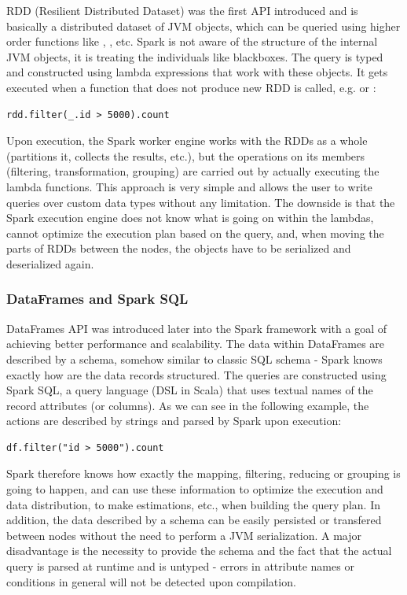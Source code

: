 RDD (Resilient Distributed Dataset) was the first API introduced and is basically a distributed dataset of JVM objects, which can be queried using higher order functions like , , etc. Spark is not aware of the structure of the internal JVM objects, it is treating the individuals like blackboxes. The query is typed and constructed using lambda expressions that work with these objects. It gets executed when a function that does not produce new RDD is called, e.g.  or :

\lstset{style=Scala}
\begin{lstlisting}
rdd.filter(_.id > 5000).count
\end{lstlisting}

Upon execution, the Spark worker engine works with the RDDs as a whole (partitions it, collects the results, etc.), but the operations on its members (filtering, transformation, grouping) are carried out by actually executing the lambda functions. This approach is very simple and allows the user to write queries over custom data types without any limitation. The downside is that the Spark execution engine does not know what is going on within the lambdas, cannot optimize the execution plan based on the query, and, when moving the parts of RDDs between the nodes, the objects have to be serialized and deserialized again.

\subsubsection{DataFrames and Spark SQL}

DataFrames API was introduced later into the Spark framework with a goal of achieving better performance and scalability. The data within DataFrames are described by a schema, somehow similar to classic SQL schema - Spark knows exactly how are the data records structured. The queries are constructed using Spark SQL, a query language (DSL in Scala) that uses textual names of the record attributes (or columns). As we can see in the following example, the actions are described by strings and parsed by Spark upon execution:

\lstset{style=Scala}
\begin{lstlisting}
df.filter("id > 5000").count
\end{lstlisting}

Spark therefore knows how exactly the mapping, filtering, reducing or grouping is going to happen, and can use these information to optimize the execution and data distribution, to make estimations, etc., when building the query plan. In addition, the data described by a schema can be easily persisted or transfered between nodes without the need to perform a JVM serialization. A major disadvantage is the necessity to provide the schema and the fact that the actual query is parsed at runtime and is untyped - errors in attribute names or conditions in general will not be detected upon compilation.

